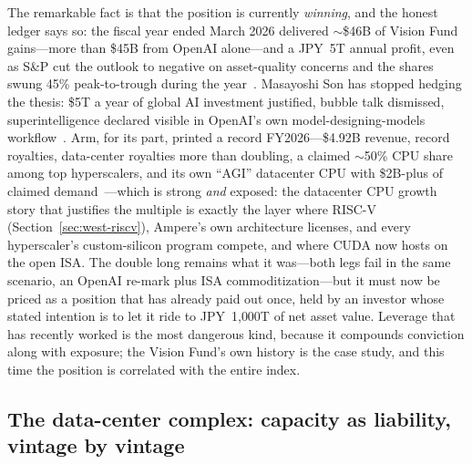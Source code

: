 The remarkable fact is that the position is currently \emph{winning}, and the honest ledger says so: the fiscal year ended March 2026 delivered $\sim$\$46B of Vision Fund gains---more than \$45B from OpenAI alone---and a JPY~5T annual profit, even as S\&P cut the outlook to negative on asset-quality concerns and the shares swung 45\% peak-to-trough during the year~\cite{softbank-fy26}. Masayoshi Son has stopped hedging the thesis: \$5T a year of global AI investment justified, bubble talk dismissed, superintelligence declared visible in OpenAI's own model-designing-models workflow~\cite{son-asi}. Arm, for its part, printed a record FY2026---\$4.92B revenue, record royalties, data-center royalties more than doubling, a claimed $\sim$50\% CPU share among top hyperscalers, and its own ``AGI'' datacenter CPU with \$2B-plus of claimed demand~\cite{arm-fy26}---which is strong \emph{and} exposed: the datacenter CPU growth story that justifies the multiple is exactly the layer where RISC-V (Section~\ref{sec:west-riscv}), Ampere's own architecture licenses, and every hyperscaler's custom-silicon program compete, and where CUDA now hosts on the open ISA. The double long remains what it was---both legs fail in the same scenario, an OpenAI re-mark plus ISA commoditization---but it must now be priced as a position that has already paid out once, held by an investor whose stated intention is to let it ride to JPY~1{,}000T of net asset value. Leverage that has recently worked is the most dangerous kind, because it compounds conviction along with exposure; the Vision Fund's own history is the case study, and this time the position is correlated with the entire index.

\subsection{The data-center complex: capacity as liability, vintage by vintage}

